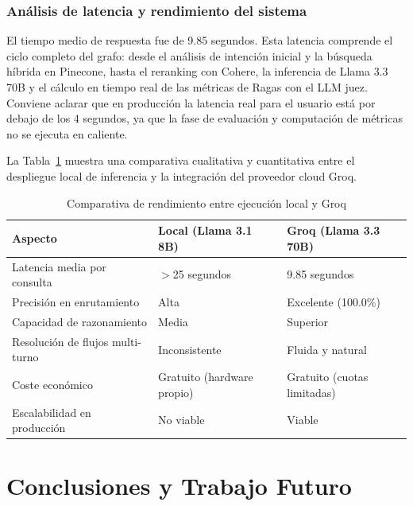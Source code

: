 \documentclass[12pt,a4paper,oneside]{report}
\begin{document}
\section{Análisis de latencia y rendimiento del sistema}

El tiempo medio de respuesta fue de 9.85 segundos. Esta latencia comprende el ciclo completo del grafo: desde el análisis de intención inicial y la búsqueda híbrida en Pinecone, hasta el reranking con Cohere, la inferencia de Llama 3.3 70B y el cálculo en tiempo real de las métricas de Ragas con el LLM juez. Conviene aclarar que en producción la latencia real para el usuario está por debajo de los 4 segundos, ya que la fase de evaluación y computación de métricas no se ejecuta en caliente.

La Tabla~\ref{tab:comparativa_local_groq} muestra una comparativa cualitativa y cuantitativa entre el despliegue local de inferencia y la integración del proveedor cloud Groq.

\begin{table}[H]
    \centering
    \caption{Comparativa de rendimiento entre ejecución local y Groq}
    \begin{tabular}{@{}p{5cm} p{4.5cm} p{4.5cm}@{}}
        \toprule
        \textbf{Aspecto}                  & \textbf{Local (Llama 3.1 8B)} & \textbf{Groq (Llama 3.3 70B)} \\
        \midrule
        Latencia media por consulta       & $>$25 segundos                & 9.85 segundos                \\
        Precisión en enrutamiento         & Alta                          & Excelente (100.0\%)           \\
        Capacidad de razonamiento         & Media                         & Superior                      \\
        Resolución de flujos multi-turno  & Inconsistente                 & Fluida y natural              \\
        Coste económico                   & Gratuito (hardware propio)    & Gratuito (cuotas limitadas)   \\
        Escalabilidad en producción       & No viable                     & Viable                        \\
        \bottomrule
    \end{tabular}
    \label{tab:comparativa_local_groq}
\end{table}


\part{Conclusiones y Trabajo Futuro}
\end{document}
